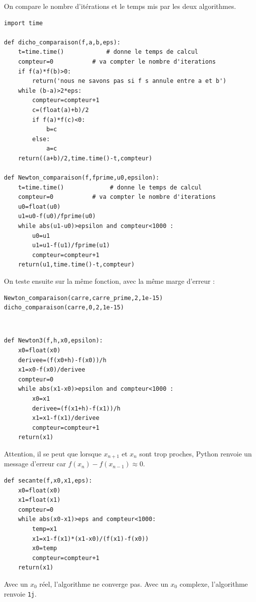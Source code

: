 \begin{solution}
On compare le nombre d'it\' erations et le temps mis par les deux algorithmes.
\begin{verbatim}
import time

def dicho_comparaison(f,a,b,eps):
    t=time.time()            # donne le temps de calcul
    compteur=0           # va compter le nombre d'iterations                
    if f(a)*f(b)>0:
        return('nous ne savons pas si f s annule entre a et b')
    while (b-a)>2*eps:
        compteur=compteur+1
        c=(float(a)+b)/2
        if f(a)*f(c)<0:
            b=c
        else:
            a=c     
    return((a+b)/2,time.time()-t,compteur)

def Newton_comparaison(f,fprime,u0,epsilon):
    t=time.time()             # donne le temps de calcul
    compteur=0           # va compter le nombre d'iterations        
    u0=float(u0)
    u1=u0-f(u0)/fprime(u0)
    while abs(u1-u0)>epsilon and compteur<1000 : 
        u0=u1
        u1=u1-f(u1)/fprime(u1)
        compteur=compteur+1
    return(u1,time.time()-t,compteur)      
\end{verbatim}
On teste ensuite sur la même fonction, avec la même marge d'erreur :
\begin{verbatim}
Newton_comparaison(carre,carre_prime,2,1e-15)
dicho_comparaison(carre,0,2,1e-15)
\end{verbatim}
\end{solution}


\begin{solution}~\\
\vspace*{-0.7cm}
\begin{verbatim}
def Newton3(f,h,x0,epsilon):
    x0=float(x0)
    derivee=(f(x0+h)-f(x0))/h
    x1=x0-f(x0)/derivee
    compteur=0
    while abs(x1-x0)>epsilon and compteur<1000 :
        x0=x1
        derivee=(f(x1+h)-f(x1))/h
        x1=x1-f(x1)/derivee
        compteur=compteur+1
    return(x1) 
\end{verbatim}
\end{solution}

\begin{solution}
Attention, il se peut que lorsque $x_{n+1}$ et $x_n$ sont trop proches, Python renvoie un message d'erreur car $f(x_{n})-f(x_{n-1})\approx 0$.
\begin{verbatim}
def secante(f,x0,x1,eps):
    x0=float(x0)
    x1=float(x1)
    compteur=0
    while abs(x0-x1)>eps and compteur<1000:
        temp=x1
        x1=x1-f(x1)*(x1-x0)/(f(x1)-f(x0))
        x0=temp
        compteur=compteur+1
    return(x1) 
\end{verbatim}
\end{solution}

\begin{solution}
Avec un $x_0$ r\' eel, l'algorithme ne converge pas. Avec un $x_0$ complexe, l'algorithme renvoie \verb?1j?.
\end{solution}


